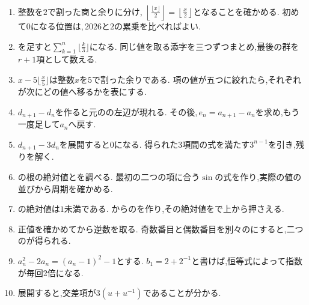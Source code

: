         \begin{enumerate}[label=\textbf{問\arabic*.},leftmargin=3.8em,format=\bookitemlink{practice-special}{hint}{problem}]
          \item 整数を$\displaystyle 2$で割った商と余りに分け,
                $\displaystyle \left\lfloor\frac{\lfloor x\rfloor}{2}\right\rfloor
                =\left\lfloor\frac{x}{2}\right\rfloor$となることを確かめる.
                初めて$\displaystyle 0$になる位置は,\,$\displaystyle 2026$と$\displaystyle 2$の累乗を比べればよい.
          \item {}を足すと$\displaystyle \sum_{k=1}^{n}\lfloor\frac{k}{3}\rfloor$になる.
                同じ値を取る添字を三つずつまとめ,最後の群を$\displaystyle r+1$項として数える.
          \item $\displaystyle x-5\lfloor\frac{x}{5}\rfloor$は整数$\displaystyle x$を$\displaystyle 5$で割った余りである.
                項の値が五つに絞れたら,それぞれが次にどの値へ移るかを表にする.
          \item $\displaystyle d_{n+1}-d_n$を作ると元のの左辺が現れる.
                その後,\,$\displaystyle e_n=a_{n+1}-a_n$を求め,もう一度足して$\displaystyle a_n$へ戻す.
          \item $\displaystyle d_{n+1}-3d_n$を展開すると$\displaystyle 0$になる.
                得られた3項間の式を満たす$\displaystyle 3^{n-1}$を引き,残りを解く.
          \item {}の根の絶対値とを調べる.
                最初の二つの項に合う$\displaystyle \sin$の式を作り,実際の値の並びから周期を確かめる.
          \item {}の絶対値は$\displaystyle 1$未満である.
                からのを作り,その絶対値をで上から押さえる.
          \item 正値を確かめてから逆数を取る.
                奇数番目と偶数番目を別々のにすると,二つのが得られる.
          \item $\displaystyle a_n^2-2a_n=(a_n-1)^2-1$とする.
                $\displaystyle b_1=2+2^{-1}$と書けば,恒等式によって指数が毎回2倍になる.
          \item 展開すると,交差項が$\displaystyle 3(u+u^{-1})$であることが分かる.

\end{enumerate}
